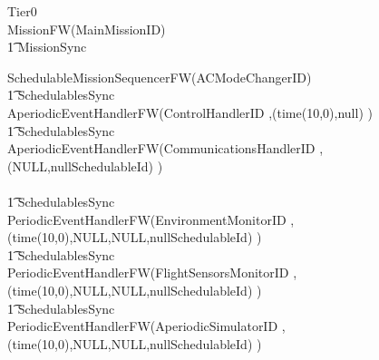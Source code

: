 \begin{circus}
\circprocess Tier0 \circdef \\

\circblockopen
	MissionFW(MainMissionID)\\
		\t1 	\lpar MissionSync \rpar \\
		\circblockopen









			SchedulableMissionSequencerFW(ACModeChangerID)\\
\t1 \lpar SchedulablesSync \rpar\\


\circblockopen
			AperiodicEventHandlerFW(ControlHandlerID ,(time(10,0),null)   )\\
			\t1 \lpar SchedulablesSync \rpar\\
			AperiodicEventHandlerFW(CommunicationsHandlerID ,(NULL,nullSchedulableId)   )\\
\circblockclose \\


\t1 \lpar SchedulablesSync \rpar\\



\circblockopen
			PeriodicEventHandlerFW(EnvironmentMonitorID ,(time(10,0),NULL,NULL,nullSchedulableId)   )\\
			\t1 \lpar SchedulablesSync \rpar\\
			PeriodicEventHandlerFW(FlightSensorsMonitorID ,(time(10,0),NULL,NULL,nullSchedulableId)   )\\
			\t1 \lpar SchedulablesSync \rpar\\
			PeriodicEventHandlerFW(AperiodicSimulatorID ,(time(10,0),NULL,NULL,nullSchedulableId)   )\\
\circblockclose \\

		\circblockclose
\circblockclose
\end{circus}
%
